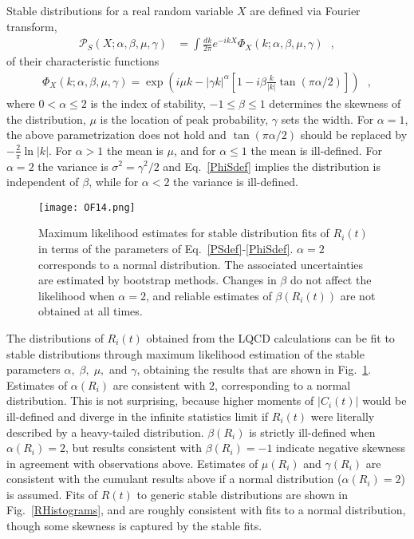 Stable distributions for a real random variable $X$ are defined via Fourier transform,
%
\begin{equation}
  \begin{split}
    \mathcal{P}_S(X;\alpha,\beta,\mu,\gamma) &= \int \frac{dk}{2\pi}e^{-i k X}\Phi_X(k;\alpha,\beta,\mu,\gamma)
    \ \ \ ,
  \end{split}
  \label{PSdef}
\end{equation}
%
of their characteristic functions
%
\begin{equation}
  \begin{split}
    \Phi_X(k;\alpha,\beta,\mu,\gamma) = \exp\left( i \mu k - |\gamma k|^\alpha\left[1 - i\beta\frac{k}{|k|}\tan(\pi\alpha/2)\right]\right)
    \ \ \  ,
  \end{split}
  \label{PhiSdef}
\end{equation}
%
where $0<\alpha\leq 2$ is the index of stability, 
$-1\leq \beta \leq 1$ determines the skewness of the distribution, 
$\mu$ is the location of peak probability, 
$\gamma$ sets the width.
For $\alpha=1$,  the above parametrization does not hold and $\tan(\pi\alpha/2)$ should be replaced by $-\frac{2}{\pi}\ln|k|$.
For $\alpha > 1$ the mean is $\mu$, and for $\alpha \leq 1$ the mean is ill-defined. 
For $\alpha =2$ the variance is $\sigma^2 = \gamma^2/2$ and Eq.~\eqref{PhiSdef} implies the distribution is independent of $\beta$,
while
for $\alpha < 2$ the variance is ill-defined.




\begin{figure}[!ht]
  \centering
  \texttt{[image: OF14.png]}
  \caption{
  Maximum likelihood estimates for stable distribution fits of $R_i(t)$ in terms of the parameters of 
  Eq.~\eqref{PSdef}-\eqref{PhiSdef}. 
  $\alpha=2$ corresponds to a normal distribution. 
  The associated uncertainties are estimated by bootstrap methods.
  Changes in $\beta$ do not affect the likelihood when $\alpha=2$, and reliable estimates of $\beta(R_i(t))$ are not obtained at all times.
  }
  \label{RStable}
\end{figure}
%
The distributions of $R_i(t)$ obtained from the LQCD calculations
can be fit to stable distributions through maximum likelihood estimation of the stable parameters 
$\alpha,\;\beta,\;\mu,$ and $\gamma$, 
obtaining the results that are shown in Fig.~\ref{RStable}. 
Estimates of $\alpha(R_i)$ are consistent with $2$, corresponding to a normal distribution. 
This is not surprising, because higher moments of $|C_i(t)|$ would be ill-defined and diverge in the infinite statistics 
limit if $R_i(t)$ were literally described by a heavy-tailed distribution. 
$\beta(R_i)$ is strictly ill-defined when $\alpha(R_i)=2$, but results consistent with $\beta(R_i) = -1$ indicate negative 
skewness in agreement with observations above. 
Estimates of $\mu(R_i)$ and $\gamma(R_i)$ are consistent with the cumulant results above if a normal distribution ($\alpha(R_i) = 2$) is assumed. 
Fits of $R(t)$ to generic stable distributions are shown in Fig.~\ref{RHistograms},  and are roughly consistent with  fits to a normal distribution, though some skewness is captured by the stable fits.




